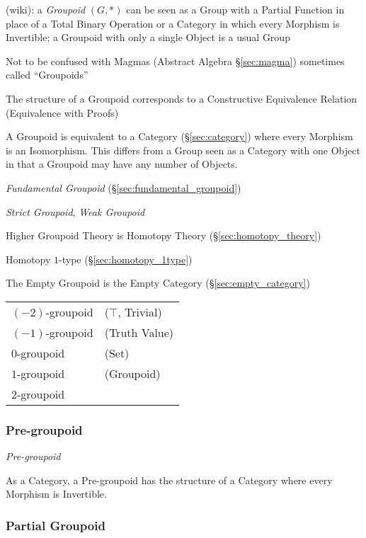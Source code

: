 (wiki): a \emph{Groupoid} $(G,*)$ can be seen as a Group with a Partial Function
in place of a Total Binary Operation or a Category in which every Morphism is
Invertible; a Groupoid with only a single Object is a usual Group

\fist Not to be confused with Magmas (Abstract Algebra \S\ref{sec:magma})
sometimes called ``Groupoids''

The structure of a Groupoid corresponds to a Constructive Equivalence
Relation (Equivalence with Proofs)

A Groupoid is equivalent to a Category (\S\ref{sec:category}) where
every Morphism is an Isomorphism. This differs from a Group seen as a
Category with one Object in that a Groupoid may have any number of
Objects.

\emph{Fundamental Groupoid} (\S\ref{sec:fundamental_groupoid})

\emph{Strict Groupoid}, \emph{Weak Groupoid}

Higher Groupoid Theory is Homotopy Theory (\S\ref{sec:homotopy_theory})

Homotopy $1$-type (\S\ref{sec:homotopy_1type})

The Empty Groupoid is the Empty Category (\S\ref{sec:empty_category})

\begin{tabular}{l l}
  $(-2)$-groupoid & ($\top$, Trivial) \\

  $(-1)$-groupoid & (Truth Value) \\

  $0$-groupoid    & (Set) \\

  $1$-groupoid    & (Groupoid) \\

  $2$-groupoid    & \\
\end{tabular}



\subsubsection{Pre-groupoid}\label{sec:pre_groupoid}

\emph{Pre-groupoid}

As a Category, a Pre-groupoid has the structure of a Category where
every Morphism is Invertible.



\subsubsection{Partial Groupoid}\label{sec:partial_groupoid}


